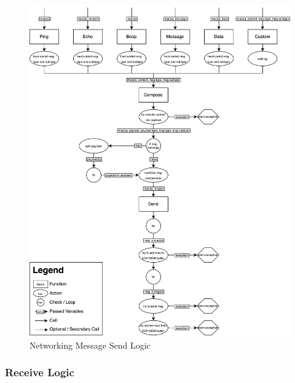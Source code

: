 \begin{figure}[H]
    \centering
    \includegraphics[width=\linewidth]{overleaf/images/send_logic.drawio.png}
    \vspace{\ftspace}
    \caption{Networking Message Send Logic}
    \label{fig:net_send_logic}
\end{figure}

\subsubsection{\label{sec:methods_recv_logic}Receive Logic}

